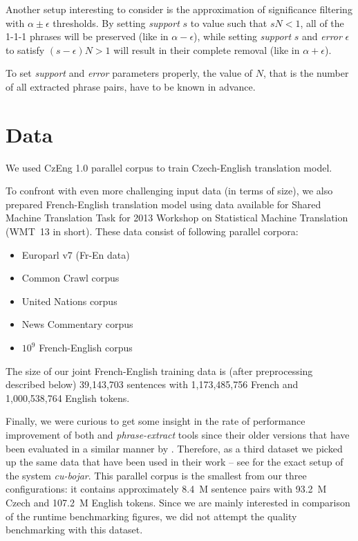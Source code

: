 Another setup interesting to consider is the approximation of significance
filtering with $\alpha \pm \epsilon$ thresholds.
By setting \emph{support} $s$ to value such that $sN < 1$, all of the 1-1-1
phrases will be preserved (like in $\alpha - \epsilon$), while setting
\emph{support} $s$ and \emph{error} $\epsilon$ to satisfy $(s - \epsilon)N > 1$
will result in their complete removal (like in $\alpha + \epsilon$).

To set \emph{support} and \emph{error} parameters properly, the value of $N$,
that is the number of all extracted phrase pairs, have to be known in advance.

\section{Data}

We used CzEng 1.0 parallel corpus \citep{czeng10:lrec2012} to train Czech-English
translation model.

To confront \eppex{} with even more challenging input data (in terms of size),
we also prepared French-English translation model using data available for
Shared Machine Translation Task for 2013 Workshop on Statistical Machine
Translation (WMT~13 in short).
These data consist of following parallel corpora:
\begin{itemize}
  \item Europarl v7 (Fr-En data)
  \item Common Crawl corpus
  \item United Nations corpus
  \item News Commentary corpus
  \item $10^9$ French-English corpus
\end{itemize}
The size of our joint French-English training data is (after preprocessing described
below) 39,143,703 sentences with 1,173,485,756 French and 1,000,538,764 English tokens.

Finally, we were curious to get some insight in the rate of performance improvement
of both \eppex{} and \emph{phrase-extract} tools since their older versions that have
been evaluated in a similar manner by \citet{przywara:eppex}.
Therefore, as a third dataset we picked up the same data that have been used in their
work -- see \citet{marecek:twostep} for the exact setup of the system \emph{cu-bojar}.
This parallel corpus is the smallest from our three configurations: it contains
approximately 8.4~M sentence pairs with 93.2~M Czech and 107.2~M English tokens.
Since we are mainly interested in comparison of the runtime benchmarking figures,
we did not attempt the quality benchmarking with this dataset.

